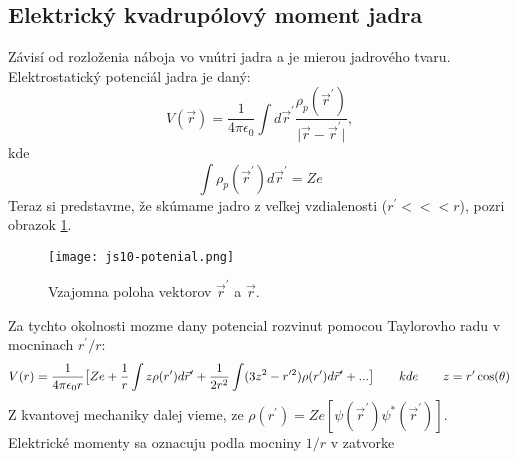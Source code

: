 \documentclass[../../main.tex]{subfiles}
\begin{document}
\subsection{Elektrický kvadrupólový moment jadra}
Závisí od rozloženia náboja vo vnútri jadra a je mierou jadrového tvaru. Elektrostatický potenciál jadra je daný:
\begin{equation}
V(\vec{r})=\frac{1}{4\pi\epsilon_0}\int d\vec{r}^{\prime}\frac{\rho_p({\vec{r}^{\prime}})}{\lvert \vec{r}-\vec{r}^{\prime} \rvert},
\end{equation}
kde 
\begin{equation}
\int \rho_p(\vec{r}^{\prime})d\vec{r}^{\prime}=Ze
\end{equation}
Teraz si predstavme, že skúmame jadro z veľkej vzdialenosti ($r^{\prime} <<< r$), pozri obrazok \ref{js10:potencial}. 
\begin{figure}
 \centerline{\texttt{[image: js10-potenial.png]}}
 \caption{Vzajomna poloha vektorov $\vec{r}^{\prime}$ a $\vec{r}$.}
 \label{js10:potencial}
\end{figure}
Za tychto okolnosti mozme dany potencial rozvinut pomocou Taylorovho radu v mocninach $r^{\prime}/r:$
\begin{equation}
V(r)=\frac{1}{4\pi\epsilon_0r} \big[ Ze+\frac{1}{r}\int z \rho(r^{\prime})d\vec{r}^{\prime}+\frac{1}{2r^2}\int(3z^2-r^{\prime2})\rho(r^{\prime})d\vec{r}^{\prime} +... \big] \hspace{0.7cm} kde \hspace{0.7cm} z=r^{\prime}\cos(\theta)
\end{equation}
Z kvantovej mechaniky dalej vieme, ze $ \rho(r^{\prime})=Ze [\psi(\vec{r}^{\prime})\psi^{*}(\vec{r}^{\prime})] $. Elektrické momenty sa oznacuju podla mocniny $1/r$ v zatvorke
\end{document}
